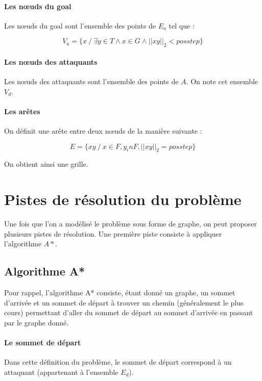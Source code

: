 \documentclass{article}
\begin{document}
\paragraph{Les n\oe uds du goal}
Les n\oe uds du goal sont l'ensemble des points de $E_a$ tel que :

\begin{equation*}
  V_a = \{ x \ / \ \exists y \in T \wedge x \in G \wedge ||xy||_2 < posstep \}
\end{equation*}

\paragraph{Les n\oe uds des attaquants}
Les n\oe uds des attaquants sont l'ensemble des points de $A$. On note cet ensemble $V_d$.

\paragraph{Les arêtes}
On définit une arête entre deux n\oe uds de la manière suivante :

\begin{equation*}
  E = \{ xy \ / \ x \in F, y _in F, ||xy||_2 = posstep \}
\end{equation*}

On obtient ainsi une grille.

\section{Pistes de résolution du problème}

Une fois que l'on a modélisé le problème sous forme de graphe, on peut proposer plusieurs pistes de résolution. Une première piste consiste à appliquer l'algorithme $A*$.

\subsection{Algorithme A*}
Pour rappel, l'algorithme A* consiste, étant donné un graphe, un sommet d'arrivée et un sommet de départ à trouver un chemin (généralement le plus cours) permettant d'aller du sommet de départ au sommet d'arrivée en passant par le graphe donné.

\paragraph{Le sommet de départ}
Dans cette définition du problème, le sommet de départ correspond à un attaquant (appartenant à l'ensemble $E_d$).
\end{document}
